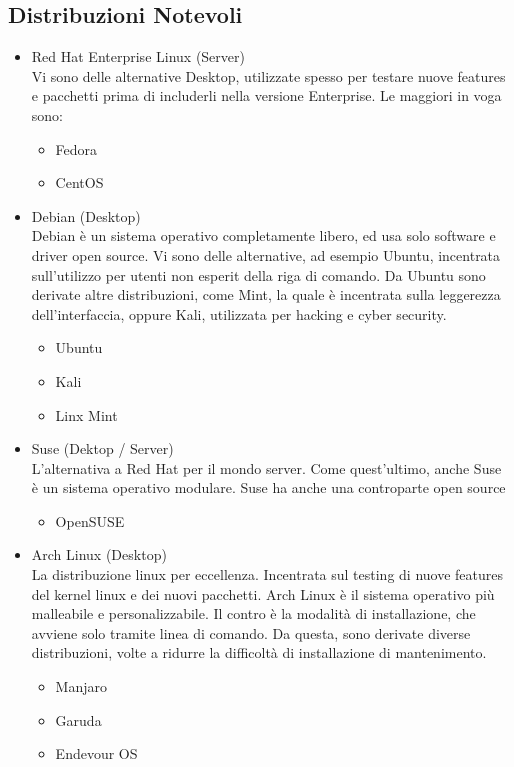 \subsection{Distribuzioni Notevoli}
\begin{itemize}
	\item Red Hat Enterprise Linux (Server)\\
		Vi sono delle alternative Desktop, utilizzate spesso per testare nuove features e pacchetti prima di includerli nella versione Enterprise. Le maggiori in voga sono:
		\begin{itemize}
			\item Fedora
			\item CentOS
		\end{itemize}
	\item Debian (Desktop)\\
		Debian è un sistema operativo completamente libero, ed usa solo software e driver open source. Vi sono delle alternative, ad esempio Ubuntu, incentrata sull'utilizzo per utenti non esperit della riga di comando. Da Ubuntu sono derivate altre distribuzioni, come Mint, la quale è incentrata sulla leggerezza dell'interfaccia, oppure Kali, utilizzata per hacking e cyber security.
	\begin{itemize}
		\item Ubuntu
		\item Kali
		\item Linx Mint
	\end{itemize}
	\item Suse (Dektop / Server)\\
	L'alternativa a Red Hat per il mondo server. Come quest'ultimo, anche Suse è un sistema operativo modulare. Suse ha anche una controparte open source
	\begin{itemize}
		\item OpenSUSE
	\end{itemize}
	\item Arch Linux (Desktop)\\
	La distribuzione linux per eccellenza. Incentrata sul testing di nuove features del kernel linux e dei nuovi pacchetti. Arch Linux è il sistema operativo più malleabile e personalizzabile. Il contro è la modalità di installazione, che avviene solo tramite linea di comando. Da questa, sono derivate diverse distribuzioni, volte a ridurre la difficoltà di installazione di mantenimento. 
	\begin{itemize}
		\item Manjaro
		\item Garuda
		\item Endevour OS
	\end{itemize}
\end{itemize}

